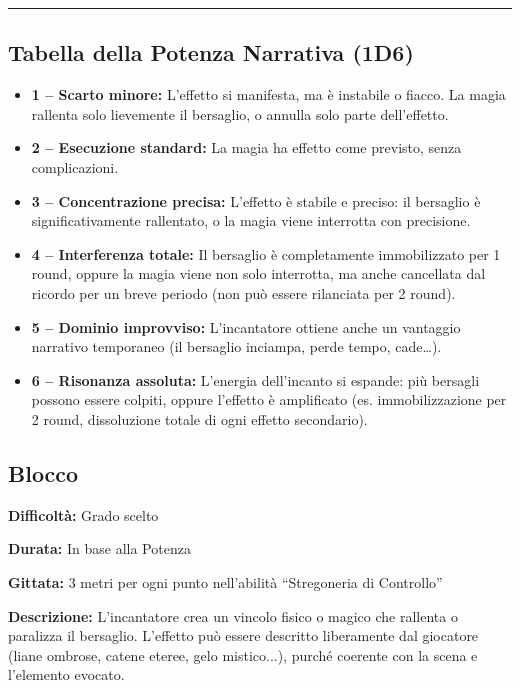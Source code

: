 \documentclass[./magie.tex]{subfiles}
\begin{document}
\vspace{0.2cm}
\noindent
\begin{center}
\rule{\textwidth}{0.4pt} 
\end{center}
\vspace{0.2cm}
\subsection*{Tabella della Potenza Narrativa (1D6)}
\begin{itemize}
\item \textbf{1 – Scarto minore:} L’effetto si manifesta, ma è instabile o fiacco. La magia rallenta solo lievemente il bersaglio, o annulla solo parte dell’effetto.
\item \textbf{2 – Esecuzione standard:} La magia ha effetto come previsto, senza complicazioni.
\item \textbf{3 – Concentrazione precisa:} L’effetto è stabile e preciso: il bersaglio è significativamente rallentato, o la magia viene interrotta con precisione.
\item \textbf{4 – Interferenza totale:} Il bersaglio è completamente immobilizzato per 1 round, oppure la magia viene non solo interrotta, ma anche cancellata dal ricordo per un breve periodo (non può essere rilanciata per 2 round).
\item \textbf{5 – Dominio improvviso:} L’incantatore ottiene anche un vantaggio narrativo temporaneo (il bersaglio inciampa, perde tempo, cade…).
\item \textbf{6 – Risonanza assoluta:} L’energia dell’incanto si espande: più bersagli possono essere colpiti, oppure l’effetto è amplificato (es. immobilizzazione per 2 round, dissoluzione totale di ogni effetto secondario).
\end{itemize}

\subsection*{Blocco}
\begin{description}
\item \textbf{Difficoltà:} Grado scelto
\item \textbf{Durata:} In base alla Potenza
\item \textbf{Gittata:} 3 metri per ogni punto nell’abilità “Stregoneria di Controllo”
\item \textbf{Descrizione:} L’incantatore crea un vincolo fisico o magico che rallenta o paralizza il bersaglio. L’effetto può essere descritto liberamente dal giocatore (liane ombrose, catene eteree, gelo mistico...), purché coerente con la scena e l’elemento evocato.
\end{description}
\end{document}
